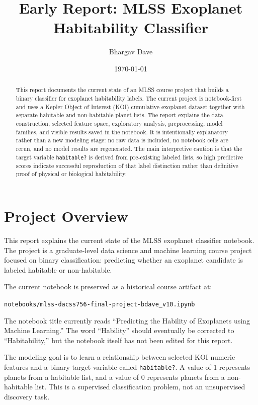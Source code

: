 \documentclass[11pt]{article}
\title{Early Report: MLSS Exoplanet Habitability Classifier}
\author{Bhargav Dave}
\date{\today}
\begin{document}
\maketitle

\begin{abstract}
This report documents the current state of an MLSS course project that builds a binary classifier for exoplanet habitability labels. The current project is notebook-first and uses a Kepler Object of Interest (KOI) cumulative exoplanet dataset together with separate habitable and non-habitable planet lists. The report explains the data construction, selected feature space, exploratory analysis, preprocessing, model families, and visible results saved in the notebook. It is intentionally explanatory rather than a new modeling stage: no raw data is included, no notebook cells are rerun, and no model results are regenerated. The main interpretive caution is that the target variable \texttt{habitable?} is derived from pre-existing labeled lists, so high predictive scores indicate successful reproduction of that label distinction rather than definitive proof of physical or biological habitability.
\end{abstract}

\tableofcontents
\newpage

\section{Project Overview}

This report explains the current state of the MLSS exoplanet classifier notebook. The project is a graduate-level data science and machine learning course project focused on binary classification: predicting whether an exoplanet candidate is labeled habitable or non-habitable.

The current notebook is preserved as a historical course artifact at:

\begin{center}
\texttt{notebooks/mlss-dacss756-final-project-bdave\_v10.ipynb}
\end{center}

The notebook title currently reads ``Predicting the Hability of Exoplanets using Machine Learning.'' The word ``Hability'' should eventually be corrected to ``Habitability,'' but the notebook itself has not been edited for this report.

The modeling goal is to learn a relationship between selected KOI numeric features and a binary target variable called \texttt{habitable?}. A value of 1 represents planets from a habitable list, and a value of 0 represents planets from a non-habitable list. This is a supervised classification problem, not an unsupervised discovery task.
\end{document}
